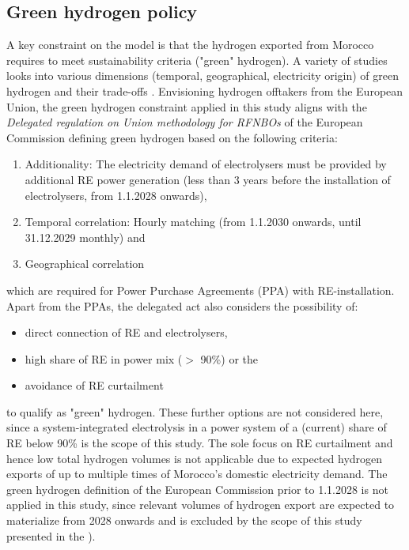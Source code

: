 \subsection*{Green hydrogen policy}
\label{subsec:green_hydrogen_constraint}

A key constraint on the model is that the hydrogen exported from Morocco requires to meet sustainability criteria ("green" hydrogen). A variety of studies looks into various dimensions (temporal, geographical, electricity origin) of green hydrogen and their trade-offs \cite{Brauer2022, Ruhnau2022, Zeyen2024}.
Envisioning hydrogen offtakers from the European Union, the green hydrogen constraint applied in this study aligns with the \emph{Delegated regulation on Union methodology for RFNBOs} of the European Commission \cite{Commission2023} defining green hydrogen  based on the following criteria:

\begin{enumerate}
    \item Additionality: The electricity demand of electrolysers must be provided by additional RE power generation (less than 3 years before the installation of electrolysers, from 1.1.2028 onwards),
    \item Temporal correlation: Hourly matching (from 1.1.2030 onwards, until 31.12.2029 monthly) and
    \item Geographical correlation
\end{enumerate}
which are required for Power Purchase Agreements (PPA) with RE-installation. Apart from the PPAs, the delegated act also considers the possibility of:
\begin{itemize}
    \item direct connection of RE and electrolysers,
    \item high share of RE in power mix ($>$ 90\%) or the
    \item avoidance of RE curtailment
\end{itemize}
to qualify as "green" hydrogen. These further options are not considered here, since a system-integrated electrolysis in a power system of a (current) share of RE below 90\% is the scope of this study. The sole focus on RE curtailment and hence low total hydrogen volumes is not applicable due to expected hydrogen exports of up to multiple times of Morocco's domestic electricity demand. The green hydrogen definition of the European Commission prior to 1.1.2028 is not applied in this study, since relevant volumes of hydrogen export are expected to materialize from 2028 onwards and is excluded by the scope of this study presented in the ).

